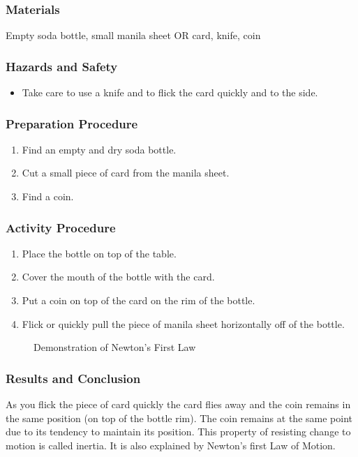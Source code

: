\subsubsection*{Materials}
Empty soda bottle, small manila sheet OR card, knife, coin

\subsubsection*{Hazards and Safety}
\begin{itemize}
\item{Take care to use a knife and to flick the card quickly and to the side.} 
\end{itemize}

\subsubsection*{Preparation Procedure}
\begin{enumerate}
\item{Find an empty and dry soda bottle.} 
\item{Cut a small piece of card from the manila sheet.} 
\item{Find a coin.} 
\end{enumerate}

\subsubsection*{Activity Procedure}
\begin{enumerate}
\item{Place the bottle on top of the table.} 
\item{Cover the mouth of the bottle with the card.} 
\item{Put a coin on top of the card on the rim of the bottle.} 
\item{Flick or quickly pull the piece of manila sheet horizontally off of the bottle.} 
\end{enumerate}

\begin{figure}
\begin{center}
\def\svgwidth{200pt}

\caption{Demonstration of Newton's First Law}
\label{fig:inertia}
\end{center}
\end{figure}

\subsubsection*{Results and Conclusion}
As you flick the piece of card quickly the card flies away and the coin remains in the same position (on top of the bottle rim). The coin remains at the same point due to its tendency to maintain its position. This property of resisting change to motion is called inertia. It is also explained by Newton's first Law of Motion.  

